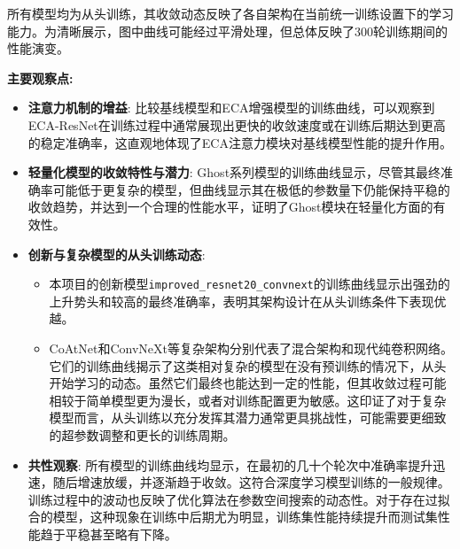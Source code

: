 \documentclass[a4paper]{article}
\begin{document}
所有模型均为从头训练，其收敛动态反映了各自架构在当前统一训练设置下的学习能力。为清晰展示，图中曲线可能经过平滑处理，但总体反映了300轮训练期间的性能演变。

\textbf{主要观察点:}
\begin{itemize}
    \item \textbf{注意力机制的增益}: 比较基线模型和ECA增强模型的训练曲线，可以观察到ECA-ResNet在训练过程中通常展现出更快的收敛速度或在训练后期达到更高的稳定准确率，这直观地体现了ECA注意力模块对基线模型性能的提升作用。
    \item \textbf{轻量化模型的收敛特性与潜力}: Ghost系列模型的训练曲线显示，尽管其最终准确率可能低于更复杂的模型，但曲线显示其在极低的参数量下仍能保持平稳的收敛趋势，并达到一个合理的性能水平，证明了Ghost模块在轻量化方面的有效性。
    \item \textbf{创新与复杂模型的从头训练动态}:
    \begin{itemize}
        \item 本项目的创新模型\texttt{improved\_resnet20\_convnext}的训练曲线显示出强劲的上升势头和较高的最终准确率，表明其架构设计在从头训练条件下表现优越。
        \item CoAtNet和ConvNeXt等复杂架构分别代表了混合架构和现代纯卷积网络。它们的训练曲线揭示了这类相对复杂的模型在没有预训练的情况下，从头开始学习的动态。虽然它们最终也能达到一定的性能，但其收敛过程可能相较于简单模型更为漫长，或者对训练配置更为敏感。这印证了对于复杂模型而言，从头训练以充分发挥其潜力通常更具挑战性，可能需要更细致的超参数调整和更长的训练周期。
    \end{itemize}
    \item \textbf{共性观察}: 所有模型的训练曲线均显示，在最初的几十个轮次中准确率提升迅速，随后增速放缓，并逐渐趋于收敛。这符合深度学习模型训练的一般规律。训练过程中的波动也反映了优化算法在参数空间搜索的动态性。对于存在过拟合的模型，这种现象在训练中后期尤为明显，训练集性能持续提升而测试集性能趋于平稳甚至略有下降。
\end{itemize}
\end{document}
